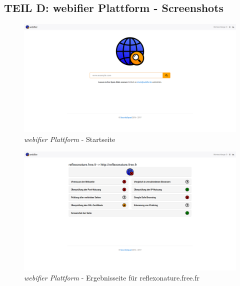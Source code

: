 \begin{landscape}

\section*{TEIL D: webifier Plattform - Screenshots}
\label{app:d}

\begin{figure}[H]
  \centering
  \includegraphics[width=\textheight]{images/platform/screenshot-start}
  \caption{\textit{webifier Plattform} - Startseite}
\end{figure}

\begin{figure}[H]
  \centering
  \includegraphics[width=\textheight]{images/platform/screenshot-reflexonature}
  \caption{\textit{webifier Plattform} - Ergebnisseite für reflexonature.free.fr}
\end{figure}



\end{landscape}
